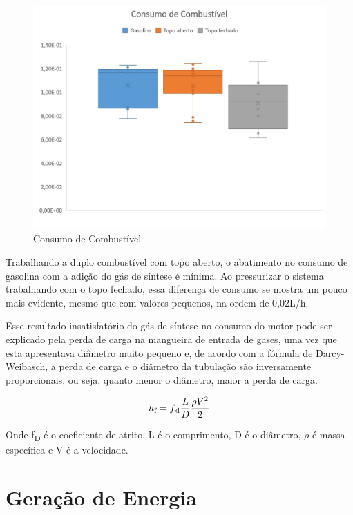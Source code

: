 \begin{figure}[!htb]
	\centering
	\includegraphics{grafico_consumo}
	\caption{Consumo de Combustível}
	\label{grafico_consumo}
\end{figure}

Trabalhando a duplo combustível com topo aberto, o abatimento no consumo de gasolina  com a adição do gás de síntese é mínima. Ao pressurizar o sistema trabalhando com o topo fechado, essa diferença de consumo se mostra um pouco mais evidente, mesmo que com valores pequenos, na ordem de 0,02L/h.

Esse resultado insatisfatório do gás de síntese no consumo do motor pode ser explicado pela perda de carga na mangueira de entrada de gases, uma vez que esta apresentava diâmetro muito pequeno e, de acordo com a fórmula de Darcy-Weibasch, a perda de carga e o diâmetro da tubulação são inversamente proporcionais, ou seja, quanto menor o diâmetro, maior a perda de carga.

\begin{equation} \label{darcy-weibasch}
 h\textsubscript{f} = f\textsubscript{d}\frac{L}{D}\frac{\rho V^2}{2}
\end{equation}

Onde f\textsubscript{D} é o coeficiente de atrito, L é o comprimento, D é o diâmetro, $\rho$ é massa específica e V é a velocidade.

\section{Geração de Energia}

